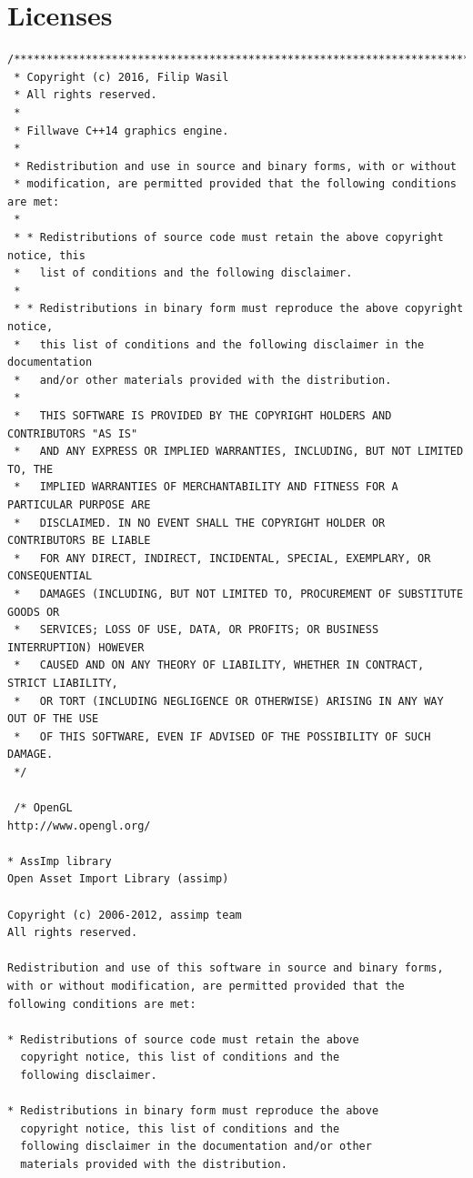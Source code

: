 \documentclass{article}
\begin{document}
\section{Licenses}\label{sec:Licenses}
\begin{lstlisting}
/**********************************************************************************
 * Copyright (c) 2016, Filip Wasil
 * All rights reserved.
 *
 * Fillwave C++14 graphics engine.
 *
 * Redistribution and use in source and binary forms, with or without
 * modification, are permitted provided that the following conditions are met:
 *
 * * Redistributions of source code must retain the above copyright notice, this
 *   list of conditions and the following disclaimer.
 *
 * * Redistributions in binary form must reproduce the above copyright notice,
 *   this list of conditions and the following disclaimer in the documentation
 *   and/or other materials provided with the distribution.
 *
 *   THIS SOFTWARE IS PROVIDED BY THE COPYRIGHT HOLDERS AND CONTRIBUTORS "AS IS"
 *   AND ANY EXPRESS OR IMPLIED WARRANTIES, INCLUDING, BUT NOT LIMITED TO, THE
 *   IMPLIED WARRANTIES OF MERCHANTABILITY AND FITNESS FOR A PARTICULAR PURPOSE ARE
 *   DISCLAIMED. IN NO EVENT SHALL THE COPYRIGHT HOLDER OR CONTRIBUTORS BE LIABLE
 *   FOR ANY DIRECT, INDIRECT, INCIDENTAL, SPECIAL, EXEMPLARY, OR CONSEQUENTIAL
 *   DAMAGES (INCLUDING, BUT NOT LIMITED TO, PROCUREMENT OF SUBSTITUTE GOODS OR
 *   SERVICES; LOSS OF USE, DATA, OR PROFITS; OR BUSINESS INTERRUPTION) HOWEVER
 *   CAUSED AND ON ANY THEORY OF LIABILITY, WHETHER IN CONTRACT, STRICT LIABILITY,
 *   OR TORT (INCLUDING NEGLIGENCE OR OTHERWISE) ARISING IN ANY WAY OUT OF THE USE
 *   OF THIS SOFTWARE, EVEN IF ADVISED OF THE POSSIBILITY OF SUCH DAMAGE.
 */
 
 /* OpenGL
http://www.opengl.org/

* AssImp library
Open Asset Import Library (assimp)

Copyright (c) 2006-2012, assimp team
All rights reserved.

Redistribution and use of this software in source and binary forms, 
with or without modification, are permitted provided that the 
following conditions are met:

* Redistributions of source code must retain the above
  copyright notice, this list of conditions and the
  following disclaimer.

* Redistributions in binary form must reproduce the above
  copyright notice, this list of conditions and the
  following disclaimer in the documentation and/or other
  materials provided with the distribution.


\end{lstlisting}
\end{document}
